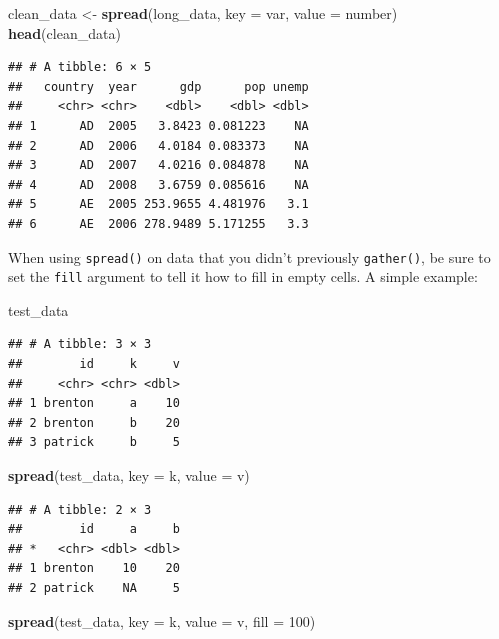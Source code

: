 \documentclass[12pt,oneside,openany]{book}
\newenvironment{Shaded}{\begin{snugshade}}{\end{snugshade}}
\newcommand{\KeywordTok}[1]{\textcolor[rgb]{0.13,0.29,0.53}{\textbf{#1}}}
\newcommand{\DataTypeTok}[1]{\textcolor[rgb]{0.13,0.29,0.53}{#1}}
\newcommand{\DecValTok}[1]{\textcolor[rgb]{0.00,0.00,0.81}{#1}}
\newcommand{\StringTok}[1]{\textcolor[rgb]{0.31,0.60,0.02}{#1}}
\newcommand{\NormalTok}[1]{#1}
\begin{document}
\begin{Shaded}
\begin{Highlighting}[]
\NormalTok{clean_data <-}\StringTok{ }\KeywordTok{spread}\NormalTok{(long_data,}
                    \DataTypeTok{key =}\NormalTok{ var,}
                    \DataTypeTok{value =}\NormalTok{ number)}
\KeywordTok{head}\NormalTok{(clean_data)}
\end{Highlighting}
\end{Shaded}

\begin{verbatim}
## # A tibble: 6 × 5
##   country  year      gdp      pop unemp
##     <chr> <chr>    <dbl>    <dbl> <dbl>
## 1      AD  2005   3.8423 0.081223    NA
## 2      AD  2006   4.0184 0.083373    NA
## 3      AD  2007   4.0216 0.084878    NA
## 4      AD  2008   3.6759 0.085616    NA
## 5      AE  2005 253.9655 4.481976   3.1
## 6      AE  2006 278.9489 5.171255   3.3
\end{verbatim}

When using \texttt{spread()} on data that you didn't previously
\texttt{gather()}, be sure to set the \texttt{fill} argument to tell it
how to fill in empty cells. A simple example:

\begin{Shaded}
\begin{Highlighting}[]
\NormalTok{test_data}
\end{Highlighting}
\end{Shaded}

\begin{verbatim}
## # A tibble: 3 × 3
##        id     k     v
##     <chr> <chr> <dbl>
## 1 brenton     a    10
## 2 brenton     b    20
## 3 patrick     b     5
\end{verbatim}

\begin{Shaded}
\begin{Highlighting}[]
\KeywordTok{spread}\NormalTok{(test_data, }\DataTypeTok{key =}\NormalTok{ k, }\DataTypeTok{value =}\NormalTok{ v)}
\end{Highlighting}
\end{Shaded}

\begin{verbatim}
## # A tibble: 2 × 3
##        id     a     b
## *   <chr> <dbl> <dbl>
## 1 brenton    10    20
## 2 patrick    NA     5
\end{verbatim}

\begin{Shaded}
\begin{Highlighting}[]
\KeywordTok{spread}\NormalTok{(test_data, }\DataTypeTok{key =}\NormalTok{ k, }\DataTypeTok{value =}\NormalTok{ v, }\DataTypeTok{fill =} \DecValTok{100}\NormalTok{)}
\end{Highlighting}
\end{Shaded}
\end{document}

